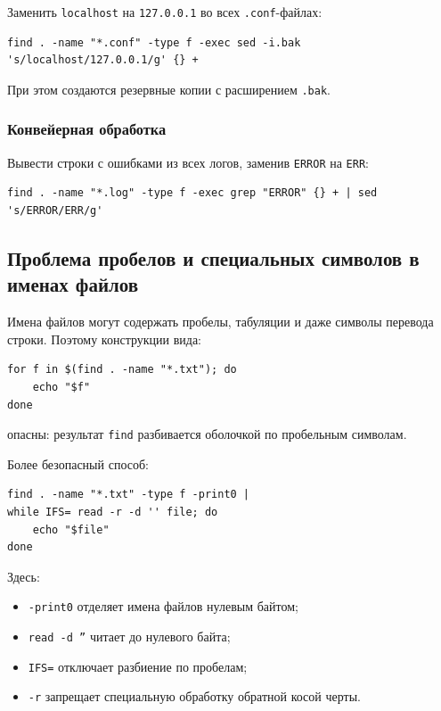 \documentclass[12pt,a4paper]{article}
\begin{document}
Заменить \texttt{localhost} на \texttt{127.0.0.1} во всех \texttt{.conf}-файлах:

\begin{verbatim}
find . -name "*.conf" -type f -exec sed -i.bak 's/localhost/127.0.0.1/g' {} +
\end{verbatim}

При этом создаются резервные копии с расширением \texttt{.bak}.

\subsubsection{Конвейерная обработка}

Вывести строки с ошибками из всех логов, заменив \texttt{ERROR} на \texttt{ERR}:

\begin{verbatim}
find . -name "*.log" -type f -exec grep "ERROR" {} + | sed 's/ERROR/ERR/g'
\end{verbatim}

\subsection{Проблема пробелов и специальных символов в именах файлов}

Имена файлов могут содержать пробелы, табуляции и даже символы перевода строки. Поэтому конструкции вида:

\begin{verbatim}
for f in $(find . -name "*.txt"); do
    echo "$f"
done
\end{verbatim}

опасны: результат \texttt{find} разбивается оболочкой по пробельным символам.

Более безопасный способ:

\begin{verbatim}
find . -name "*.txt" -type f -print0 |
while IFS= read -r -d '' file; do
    echo "$file"
done
\end{verbatim}

Здесь:

\begin{itemize}
    \item \texttt{-print0} отделяет имена файлов нулевым байтом;
    \item \texttt{read -d ''} читает до нулевого байта;
    \item \texttt{IFS=} отключает разбиение по пробелам;
    \item \texttt{-r} запрещает специальную обработку обратной косой черты.
\end{itemize}
\end{document}
